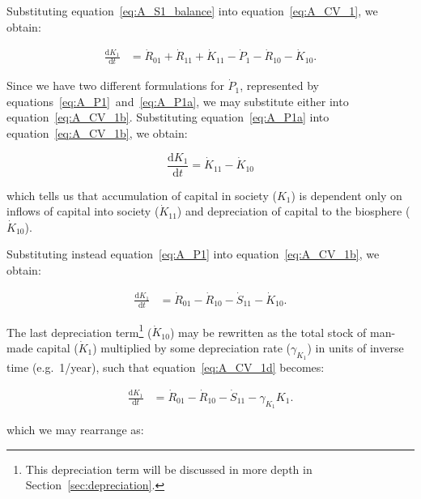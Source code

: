 

Substituting equation~\ref{eq:A_S1_balance} 
into equation~\ref{eq:A_CV_1}, we obtain:

\begin{align}\label{eq:A_CV_1b}
	\frac{\mathrm{d}K_{1}}{\mathrm{d}t}		&
	= \dot{R}_{01} 
	+ \dot{R}_{11}
	+ \dot{K}_{11}
	- \dot{P}_{1}				
	- \dot{R}_{10}				
	- \dot{K}_{10}.
\end{align}

Since we have two different formulations for $\dot{P}_{1}$,
represented by equations~\ref{eq:A_P1}~and~\ref{eq:A_P1a}, 
we may substitute either into equation~\ref{eq:A_CV_1b}.
Substituting equation~\ref{eq:A_P1a} 
into equation~\ref{eq:A_CV_1b}, we obtain:

\begin{equation}\label{eq:A_CV_1c}
	\frac{\mathrm{d}K_{1}}{\mathrm{d}t}		
	= \dot{K}_{11}
	- \dot{K}_{10}
\end{equation}

\noindent{}which tells us that accumulation of capital in society 
($K_{1}$) is dependent only on inflows of capital into society ($\dot{K}_{11}$) 
and depreciation of capital to the biosphere ($\dot{K}_{10}$).

Substituting instead equation~\ref{eq:A_P1} 
into equation~\ref{eq:A_CV_1b}, we obtain:

 \begin{align}\label{eq:A_CV_1d}
	\frac{\mathrm{d}K_{1}}{\mathrm{d}t}		&
	= \dot{R}_{01} 
	- \dot{R}_{10}
	- \dot{S}_{11}
	- \dot{K}_{10}.
\end{align}

The last depreciation term\footnote{This
depreciation term will be discussed in more depth in
Section~\ref{sec:depreciation}.} 
($\dot{K}_{10}$)
may be rewritten as the total stock
of man-made capital ($\dot{K}_{1}$) 
multiplied by some depreciation rate ($\gamma_{K_{1}}$)
in units of inverse time (e.g.\ 1/year),
such that equation~\ref{eq:A_CV_1d} becomes:

 \begin{align}\label{eq:A_CV_1e}
	\frac{\mathrm{d}K_{1}}{\mathrm{d}t}		&
	= \dot{R}_{01} 
	- \dot{R}_{10}
	- \dot{S}_{11}
	- \gamma_{K_{1}}{K}_{1}.
\end{align}

\noindent{}which we may rearrange as:

